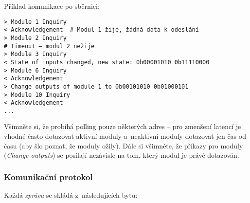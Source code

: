 Příklad komunikace po sběrnici:

\begin{verbatim}
> Module 1 Inquiry
< Acknowledgement  # Modul 1 žije, žádná data k odeslání
> Module 2 Inquiry
# Timeout – modul 2 nežije
> Module 3 Inquiry
< State of inputs changed, new state: 0b00001010 0b11110000
> Module 6 Inquiry
< Acknowledgement
> Change outputs of module 1 to 0b00101010 0b01000101
> Module 10 Inquiry
< Acknowledgement
...
\end{verbatim}

Všimněte si, že probíhá polling pouze některých adres – pro zmenšení latencí je
vhodné často dotazovat aktivní moduly a~neaktivní moduly dotazovat jen čas od
času (aby šlo poznat, že moduly ožily). Dále si všimněte, že příkazy pro
moduly (\textit{Change outputs}) se posílají nezávisle na tom, který modul je
právě dotazován.

\subsubsection{Komunikační protokol} \label{subsub:mtbbus-proto-strucure}

Každá \textit{zpráva} se skládá z~následujících bytů:

